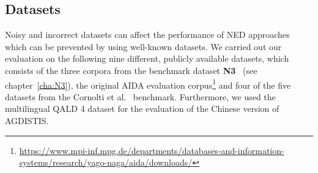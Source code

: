 
\subsection{Datasets}
Noisy and incorrect datasets can affect the performance of \ac{NED} approaches which can be prevented by using well-known datasets.
We carried out our evaluation on the following nine different, publicly available datasets, which consists of the three corpora from the benchmark dataset \textbf{N3}~\cite{n3} (see chapter~\ref{cha:N3}), the original AIDA evaluation corpus\footnote{\url{https://www.mpi-inf.mpg.de/departments/databases-and-information-systems/research/yago-naga/aida/downloads/}} and four of the five datasets from the Cornolti et al.~\cite{cornolti} benchmark. Furthermore, we used the multilingual QALD 4 dataset for the evaluation of the Chinese version of AGDISTIS.

